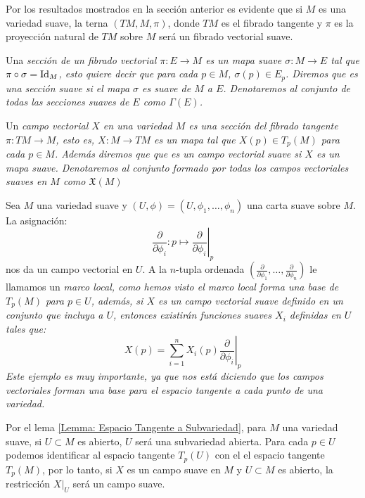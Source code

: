 Por los resultados mostrados en la sección anterior es evidente que si $M$ es una variedad suave, la terna $(TM, M, \pi)$, donde $TM$ es el fibrado tangente y $\pi$ es la proyección natural de $TM$ sobre $M$ será un fibrado vectorial suave.

\begin{definition}
	Una \it{sección} de un fibrado vectorial $\pi: E \to M$ es un mapa suave $\sigma: M \to E$ tal que $\pi \circ \sigma = \mathrm{Id}_{M}$, esto quiere decir que para cada $p \in M$, $\sigma(p) \in E_p$. Diremos que es una \it{sección suave} si el mapa $\sigma$ es suave de $M$ a $E$. Denotaremos al conjunto de todas las secciones suaves de $E$ como $\Gamma(E)$.
\end{definition}

\begin{definition}
	Un \it{campo vectorial} $X$ en una variedad $M$ es una sección del fibrado tangente $\pi: TM \to M$, esto es, $X: M \to TM$ es un mapa tal que $X(p) \in T_{p}(M)$ para cada $p \in M$. Además diremos que que es un \it{campo vectorial suave} si $X$ es un mapa suave. Denotaremos al conjunto formado por todas los campos vectoriales suaves en $M$ como $\mathfrak{X}(M)$
\end{definition}

\begin{example}
	Sea $M$ una variedad suave y $(U,\phi)=(U,\phi_1, \dots,\phi_n)$ una carta suave sobre $M$. La asignación:
	\[
		\frac{\partial}{\partial \phi_i}: p \mapsto \left. \frac{\partial}{\partial \phi_i}\right|_{p}
	\]
	nos da un campo vectorial en $U$. A la $n$-tupla ordenada $(\frac{\partial}{\partial \phi_1}, \dots, \frac{\partial}{\partial \phi_n})$ le llamamos un \it{marco local}, como hemos visto el marco local forma una base de $T_p(M)$ para $p \in U$, además, si $X$ es un campo vectorial suave definido en un conjunto que incluya a $U$, entonces existirán funciones suaves $X_i$ definidas en $U$ tales que:
	\[
		X(p) = \sum_{i=1}^{n}X_i(p)\left.\frac{\partial}{\partial\phi_i} \right|_{p}
	\]
	Este ejemplo es muy importante, ya que nos está diciendo que los campos vectoriales forman una base para el espacio tangente a cada punto de una variedad.
\end{example}

Por el lema \ref{Lemma: Espacio Tangente a Subvariedad}, para $M$ una variedad suave, si $U \subset M$ es abierto, $U$ será una subvariedad abierta. Para cada $p \in U$ podemos identificar al espacio tangente $T_p(U)$ con el el espacio tangente $T_p(M)$, por lo tanto, si $X$ es un campo suave en $M$ y $U \subset M$ es abierto, la restricción $X|_{U}$ será un campo suave.

